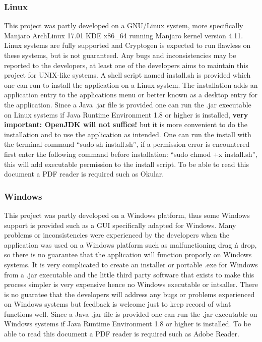 \documentclass[11pt]{article}
\begin{document}
	\subsubsection{Linux}
	This project was partly developed on a GNU/Linux system, more specifically Manjaro ArchLinux 17.01 KDE x86\_64 running Manjaro kernel version 4.11. Linux systems are fully supported and Cryptogen is expected to run flawless on these systems, but is not guaranteed. Any bugs and inconsistencies may be reported to the developers, at least one of the developers aims to maintain this project for UNIX-like systems. A shell script named install.sh is provided which one can run to install the application on a Linux system. The installation adds an application entry to the applications menu or better known as a desktop entry for the application. Since a Java .jar file is provided one can run the .jar executable on Linux systems if Java Runtime Environment 1.8 or higher is installed, \textbf{very important: OpenJDK will not suffice!} but it is more convenient to do the installation and to use the application as intended. One can run the install with the terminal command ``sudo sh install.sh'', if a permission error is encountered first enter the following command before installation: ``sudo chmod +x install.sh'', this will add executable permission to the install script. To be able to read this document a PDF reader is required such as Okular.

	\subsubsection{Windows}
	This project was partly developed on a Windows platform, thus some Windows support is provided such as a GUI specifically adapted for Windows. Many problems or inconsistencies were experienced by the developers when the application was used on a Windows platform such as malfunctioning drag \'n drop, so there is no guarantee that the application will function proporly on Windows systems. It is very complicated to create an installer or portable .exe for Windows from a .jar executable and the little third party software that exists to make this process simpler is very expensive hence no Windows executable or intsaller. There is no guaratee that the developers will address any bugs or problems experienced on Windows systems but feedback is welcome just to keep record of what functions well. Since a Java .jar file is provided one can run the .jar executable on Windows systems if Java Runtime Environment 1.8 or higher is installed. To be able to read this document a PDF reader is required such as Adobe Reader.
\end{document}
